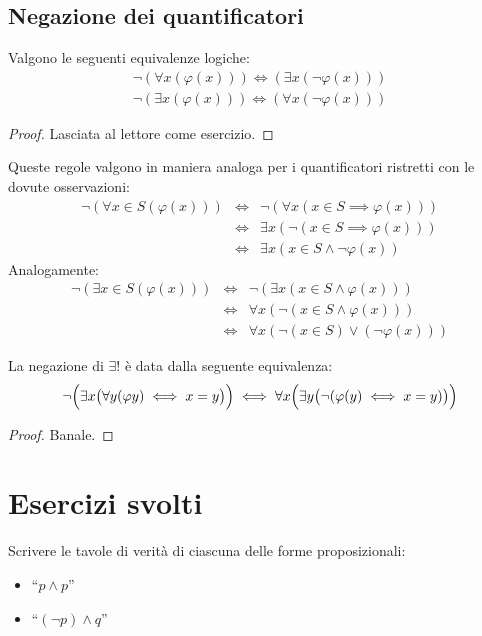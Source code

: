 \subsection{Negazione dei quantificatori}
\begin{propbox}\label{prop:negazione_quantificatori}
	Valgono le seguenti equivalenze logiche:
	\begin{eqnarray}
		\neg(\forall x (\varphi(x))) \iff (\exists x (\neg \varphi(x))) \label{eq:negazione_universale}\\
		\neg(\exists x (\varphi(x))) \iff (\forall x (\neg \varphi(x))) \label{eq:negazione_esistenziale}
	\end{eqnarray}
\end{propbox}
\begin{proof}
	Lasciata al lettore come esercizio.
\end{proof}

Queste regole valgono in maniera analoga per i quantificatori ristretti con le dovute osservazioni:
\begin{eqnarray*}
	\neg(\forall x \in S(\varphi(x))) &\iff & \neg (\forall x (x \in S \implies \varphi(x)))  \\
	&\iff & \exists x (\neg (x \in S\implies \varphi(x))) \\
	&\iff & \exists x (x \in S \land \neg \varphi(x))
\end{eqnarray*}
Analogamente:
\begin{eqnarray*}
	\neg (\exists x \in S(\varphi(x))) &\iff & \neg(\exists x( x \in S \land \varphi(x)))  \\
	&\iff & \forall x (\neg(x\in S \land \varphi(x))) \\
	&\iff & \forall x (\neg (x \in S) \lor (\neg \varphi(x)))
\end{eqnarray*}
\begin{propbox}
	La negazione di $\exists!$ è data dalla seguente equivalenza:
	\begin{equation}
		\neg\Bigl(\exists x\bigl(\forall y (\varphi y) \iff x=y\bigr)\Bigr) \iff
		\forall x \Bigl(\exists y \bigl(\neg (\varphi(y) \iff x=y)\bigl)\Bigr)
	\end{equation}
\end{propbox}

\begin{proof}
	Banale.
\end{proof}
\newpage
\section{Esercizi svolti}
\begin{exsbox}
	Scrivere le tavole di verità di ciascuna delle forme proposizionali:
	\begin{itemize}
		\item ``$p \land p$''
		\item ``$(\neg p)\land q$''
	\end{itemize}
\end{exsbox}

